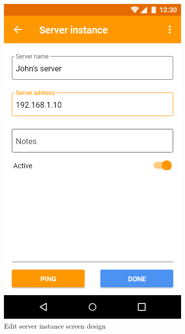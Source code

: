\begin{figure}\centering
    \begin{minipage}[b]{0.32\textwidth}
    	\includegraphics[width=\textwidth]{pics/xd/Edit server instance.png}
    	\caption[Edit server instance]{Edit server instance screen design}\label{fig:xdEditServerInstance}
    \end{minipage}
    \begin{minipage}[b]{0.32\textwidth}

\end{minipage}
\end{figure}
